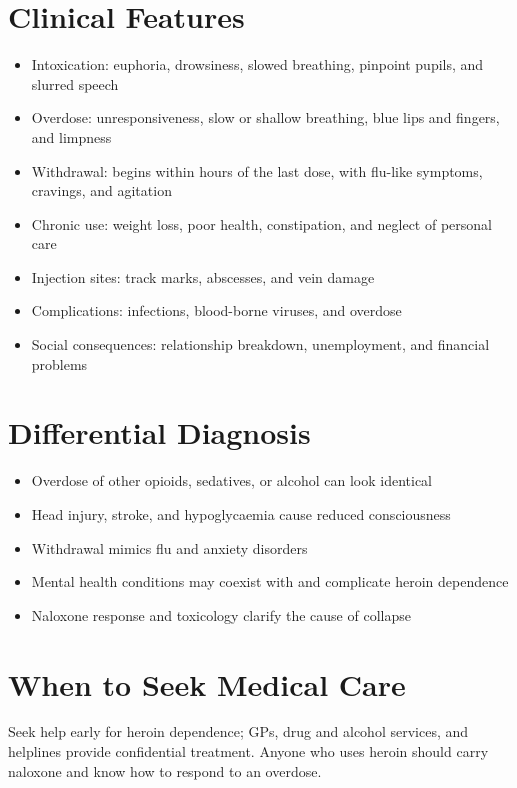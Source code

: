 \section*{Clinical Features}
\begin{itemize}
    \item Intoxication: euphoria, drowsiness, slowed breathing, pinpoint pupils, and slurred speech
    \item Overdose: unresponsiveness, slow or shallow breathing, blue lips and fingers, and limpness
    \item Withdrawal: begins within hours of the last dose, with flu-like symptoms, cravings, and agitation
    \item Chronic use: weight loss, poor health, constipation, and neglect of personal care
    \item Injection sites: track marks, abscesses, and vein damage
    \item Complications: infections, blood-borne viruses, and overdose
    \item Social consequences: relationship breakdown, unemployment, and financial problems
\end{itemize}

\section*{Differential Diagnosis}
\begin{itemize}
    \item Overdose of other opioids, sedatives, or alcohol can look identical
    \item Head injury, stroke, and hypoglycaemia cause reduced consciousness
    \item Withdrawal mimics flu and anxiety disorders
    \item Mental health conditions may coexist with and complicate heroin dependence
    \item Naloxone response and toxicology clarify the cause of collapse
\end{itemize}

\section*{When to Seek Medical Care}
Seek help early for heroin dependence; GPs, drug and alcohol services, and helplines provide confidential treatment. Anyone who uses heroin should carry naloxone and know how to respond to an overdose.

